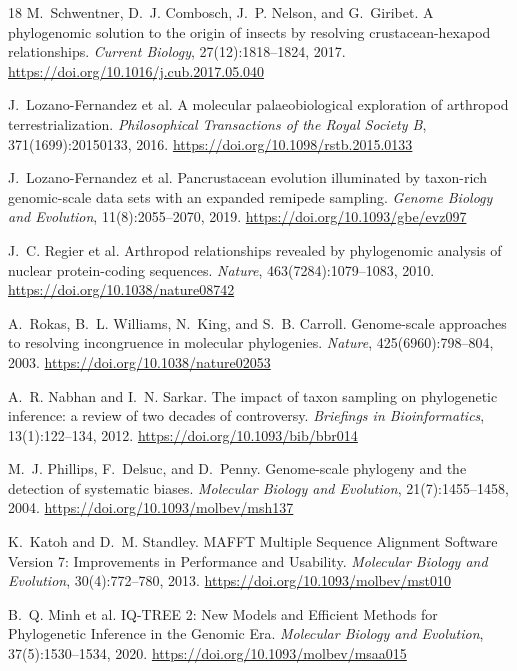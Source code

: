 \documentclass[10pt,letterpaper]{article}
\begin{document}
\begin{thebibliography}{18}
M.~Schwentner, D.~J. Combosch, J.~P. Nelson, and G.~Giribet.
\newblock A phylogenomic solution to the origin of insects by resolving crustacean-hexapod relationships.
\newblock \emph{Current Biology}, 27(12):1818--1824, 2017. \url{https://doi.org/10.1016/j.cub.2017.05.040}

J.~Lozano-Fernandez et al.
\newblock A molecular palaeobiological exploration of arthropod terrestrialization.
\newblock \emph{Philosophical Transactions of the Royal Society B}, 371(1699):20150133, 2016. \url{https://doi.org/10.1098/rstb.2015.0133}

J.~Lozano-Fernandez et al.
\newblock Pancrustacean evolution illuminated by taxon-rich genomic-scale data sets with an expanded remipede sampling.
\newblock \emph{Genome Biology and Evolution}, 11(8):2055--2070, 2019. \url{https://doi.org/10.1093/gbe/evz097}

J.~C. Regier et al.
\newblock Arthropod relationships revealed by phylogenomic analysis of nuclear protein-coding sequences.
\newblock \emph{Nature}, 463(7284):1079--1083, 2010. \url{https://doi.org/10.1038/nature08742}

A.~Rokas, B.~L. Williams, N.~King, and S.~B. Carroll.
\newblock Genome-scale approaches to resolving incongruence in molecular phylogenies.
\newblock \emph{Nature}, 425(6960):798--804, 2003. \url{https://doi.org/10.1038/nature02053}

A.~R. Nabhan and I.~N. Sarkar.
\newblock The impact of taxon sampling on phylogenetic inference: a review of two decades of controversy.
\newblock \emph{Briefings in Bioinformatics}, 13(1):122--134, 2012. \url{https://doi.org/10.1093/bib/bbr014}

M.~J. Phillips, F.~Delsuc, and D.~Penny.
\newblock Genome-scale phylogeny and the detection of systematic biases.
\newblock \emph{Molecular Biology and Evolution}, 21(7):1455--1458, 2004. \url{https://doi.org/10.1093/molbev/msh137}

K.~Katoh and D.~M. Standley.
\newblock MAFFT Multiple Sequence Alignment Software Version 7: Improvements in Performance and Usability.
\newblock \emph{Molecular Biology and Evolution}, 30(4):772--780, 2013. \url{https://doi.org/10.1093/molbev/mst010}

B.~Q. Minh et al.
\newblock IQ-TREE 2: New Models and Efficient Methods for Phylogenetic Inference in the Genomic Era.
\newblock \emph{Molecular Biology and Evolution}, 37(5):1530--1534, 2020. \url{https://doi.org/10.1093/molbev/msaa015}


\end{thebibliography}
\end{document}
